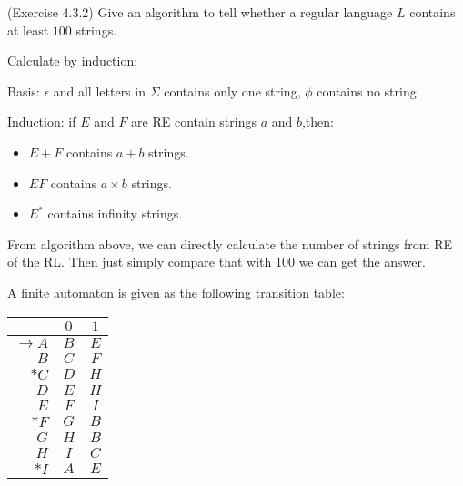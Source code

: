 \documentclass[10pt]{homework}
\begin{document}
\begin{problem} (Exercise 4.3.2) Give an algorithm to tell whether a regular
  language $L$ contains at least $100$ strings.
\end{problem}

\begin{solution}
    Calculate by induction:

    Basis: $\epsilon$ and all letters in $\Sigma$ contains only one string, $\phi$ contains no string.

    Induction: if $E$ and $F$ are RE contain strings $a$ and $b$,then:
    \begin{itemize}
        \item $E+F$ contains $a+b$ strings.
        \item $EF$ contains $a\times b$ strings.
        \item $E^{*}$ contains infinity strings.
    \end{itemize}
    From algorithm above, we can directly calculate the number of strings from RE of the RL. Then just simply compare that with 100 we can get the answer.
\end{solution}

\begin{problem}
  A finite automaton is given as the following transition table:
  \begin{table}[H]
    \centering
    \begin{tabular}{r||c|c} %
      & $0$ & $1$\\\hline\hline  %
      $\rightarrow A$ & $B$ & $E$\\
      $B$ & $C$ & $F$\\
      $*C$ & $D$ & $H$\\
      $D$ & $E$ & $H$\\
      $E$ & $F$ & $I$\\
      $*F$ & $G$ & $B$\\
      $G$ & $H$ & $B$\\
      $H$ & $I$ & $C$\\
      $*I$ & $A$ & $E$\\
    \end{tabular}
  \end{table}
\end{problem}
\end{document}

